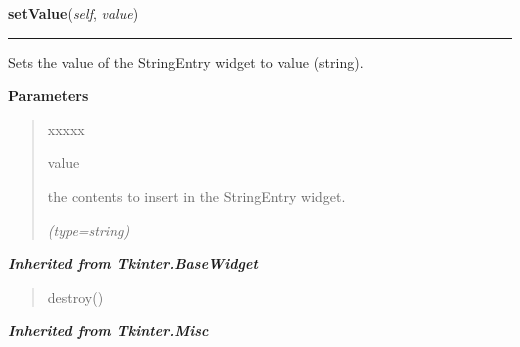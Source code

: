 \hspace{.8\funcindent}\begin{boxedminipage}{\funcwidth}

    \raggedright \textbf{setValue}(\textit{self}, \textit{value})

    \vspace{-1.5ex}

    \rule{\textwidth}{0.5\fboxrule}
\setlength{\parskip}{2ex}
    Sets the value of the StringEntry widget to {\textbar}value{\textbar} 
    (string).

\setlength{\parskip}{1ex}
      \textbf{Parameters}
      \vspace{-1ex}

      \begin{quote}
        \begin{Ventry}{xxxxx}

          \item[value]

          the contents to insert in the StringEntry widget.

            {\it (type=string)}

        \end{Ventry}

      \end{quote}

    \end{boxedminipage}


\large{\textbf{\textit{Inherited from Tkinter.BaseWidget}}}

\begin{quote}
destroy()
\end{quote}

\large{\textbf{\textit{Inherited from Tkinter.Misc}}}

